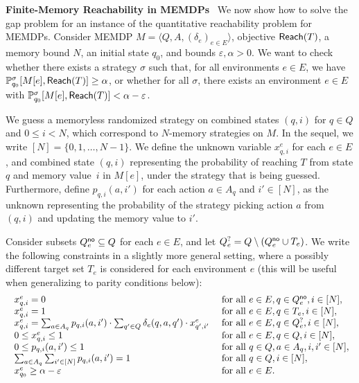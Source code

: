 \documentclass[a4paper,USenglish,cleveref, autoref, thm-restate]{lipics-v2021}
\let\epsilon\varepsilon
\def\myparagraph#1{\noindent\textbf{#1}~}
\newcommand{\tuple}[1]{\langle #1 \rangle}
\newcommand*{\pr}{\mathbb{P}}
\newcommand\Reach{\textrm{\sf Reach}}
\begin{document}
\myparagraph{Finite-Memory Reachability in MEMDPs}
We now show how to solve the gap problem for an instance of the quantitative reachability problem for MEMDPs.
Consider MEMDP $M=\tuple{Q,A,(\delta_e)_{e\in E}}$, objective $\Reach(T)$, a memory bound $N$,
an initial state $q_0$, and bounds $\epsilon,\alpha>0$.
We want to check whether there exists a strategy $\sigma$ such that, for all environments $e \in E$, 
we have $\pr_{q_0}^\sigma[M[e],\Reach(T)]\geq \alpha$,
or whether for all $\sigma$, there exists an environment $e \in E$ with 
$\pr_{q_0}^\sigma[M[e],\Reach(T)]< \alpha-\epsilon$.

We guess a memoryless randomized strategy on combined states $(q,i)$ for $q \in Q$ and $0\leq i< N$,
which correspond to $N$-memory strategies on $M$.
In the sequel, we write $[N] = \{0,1,\dots,N-1\}$.
We define the unknown variable $x_{q,i}^e$ for each $e \in E$, and combined state $(q,i)$
representing the probability of reaching $T$ from state $q$ and memory value~$i$ in $M[e]$, under the strategy that is being guessed.
Furthermore, define $p_{q,i}(a,i')$ for each action $a \in A_q$ and $i' \in [N]$, as the unknown representing 
the probability of the strategy picking action $a$ from $(q,i)$ and updating the memory value to $i'$.

Consider subsets $Q^{\textsf{no}}_e \subseteq Q$ for each $e \in E$,
and let $Q^{?}_e = Q \setminus (Q^{\textsf{no}}_e \cup T_e)$.
We write the following constraints in a slightly more general setting, 
where a possibly different target set $T_e$ is considered for each environment $e$
(this will be useful when generalizing to parity conditions below):
\begin{equation}
  \label{eqn:memdp-reach}
  \!\!\!\!\begin{array}{lll}
    &x_{q,i}^e = 0  & \text{ for all } e \in E, q \in \Qno_e, i \in [N], \\
    &x_{q,i}^e = 1  & \text{ for all } e \in E, q \in T_e,    i \in [N], \\
    &x_{q,i}^e = \sum_{a \in A_q} p_{q,i}(a,i') \cdot \sum_{q' \in Q} \delta_e(q,a,q') \cdot x_{q',i'}^e  & \text{ for all } e \in E, q \in \Qquestion_e, i \in [N], \\
    &0 \leq x_{q,i}^e \leq 1  & \text{ for all } e \in E, q \in Q, i \in [N], \\
    &0 \leq p_{q,i}(a,i') \leq 1  & \text{ for all } q \in Q, a \in A_q, i,i' \in [N], \\
    &\sum_{a \in A_q}\sum_{i' \in [N]} p_{q,i}(a,i') = 1  & \text{ for all } q \in Q, i \in [N],\\
    &x_{q_0}^e \geq \alpha-\epsilon  & \text{ for all } e \in E.
  \end{array}
\end{equation}
\end{document}

